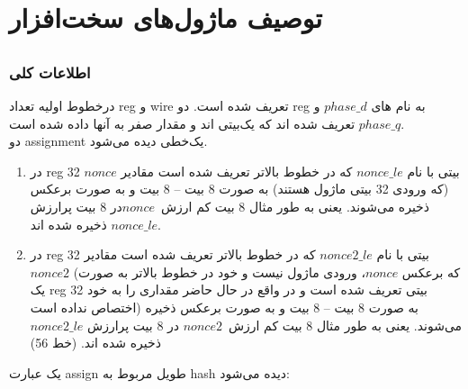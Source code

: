 \pagebreak
\section{توصیف ماژول‌های سخت‌افزار}
\subsection{}
\subsubsection{اطلاعات کلی}
درخطوط اولیه تعداد reg و wire تعریف شده است.
دو reg به نام های $ phase\_d$ و $phase\_q $ تعریف شده اند که یک‌بیتی اند و مقدار صفر به آنها داده شده است.\\
دو assignment یک‌خطی دیده می‌شود.

\begin{enumerate}
	\item در reg 32 بیتی با نام $nonce\_le$ که در خطوط بالاتر تعریف شده است مقادیر $nonce$ (که ورودی 32 بیتی ماژول هستند) به صورت 8 بیت – 8 بیت و به صورت برعکس ذخیره می‌شوند. یعنی به طور مثال 8 بیت کم ارزش\  $nonce$در 8 بیت پرارزش $nonce\_le$ ذخیره شده اند.
	      
	\item در reg 32 بیتی با نام $nonce2\_le$ که در خطوط بالاتر تعریف شده است مقادیر $nonce2$ (که برعکس $nonce$، ورودی ماژول نیست و خود در خطوط بالاتر به صورت یک reg 32 بیتی تعریف شده است و در واقع در حال حاضر مقداری را به خود اختصاص نداده است) به صورت 8 بیت – 8 بیت و به صورت برعکس ذخیره می‌شوند. یعنی به طور مثال 8 بیت کم ارزش\  $nonce2$ در 8 بیت پرارزش  $nonce2\_le$ ذخیره شده اند. (خط 56)
\end{enumerate}

یک عبارت assign طویل مربوط به hash دیده می‌شود:

